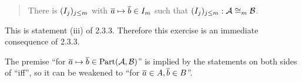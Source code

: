 \begin{enumerate}[1.]
\begin{quote}
There is $(I_j)_{j \leq m}$ with $\overline{a} \mapsto \overline{b} \in I_m$ such that $\seqi{I_j}{j \leq m} : \strct{A} \isom[m] \strct{B}$.
\end{quote}
This is statement (iii) of 2.3.3. Therefore this exercise is an immediate consequence of 2.3.3.
\begin{remark}
The premise ``for $\overline{a} \mapsto \overline{b} \in {\mathrm{Part}(\mathcal{A}, \mathcal{B})}$'' is implied by the statements on both sides of ``iff'', so it can be weakened to ``for $\overline{a} \in A, \overline{b} \in B$''.
\end{remark}
%
\end{enumerate}
